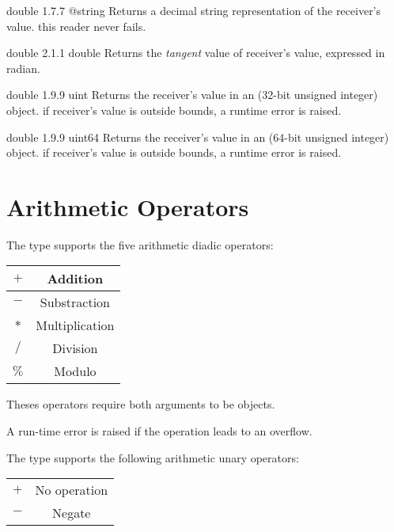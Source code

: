 {double}
{1.7.7}
{@string}
{Returns a decimal string representation of the receiver's value.}
{this reader never fails.}




{double}
{2.1.1}
{double}
{Returns the \emph{tangent} value of receiver's value, expressed in radian.}
{}







{double}
{1.9.9}
{uint}
{Returns the receiver's value in an  (32-bit unsigned integer) object.}
{if receiver's value is outside  bounds, a runtime error is raised.}





{double}
{1.9.9}
{uint64}
{Returns the receiver's value in an  (64-bit unsigned integer) object.}
{if receiver's value is outside  bounds, a runtime error is raised.}




\section{Arithmetic Operators}

The  type supports the five arithmetic diadic operators:\newline

\begin{tabular}{|c|c|}
\hline
$+$ & Addition \\
\hline
$-$ & Substraction \\
\hline
$*$ & Multiplication \\
\hline
$/$ & Division \\
\hline
$\%$ & Modulo \\
\hline
\end{tabular}

Theses operators require both arguments to be  objects.\newline

A run-time error is raised if the operation leads to an overflow.

The  type supports the following arithmetic unary operators:\newline

\begin{tabular}{|c|c|}
\hline
$+$ & No operation \\
$-$ & Negate \\
\hline
\end{tabular}

